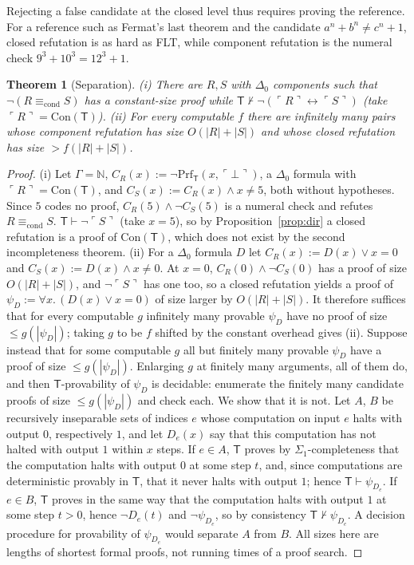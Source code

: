 \documentclass[10pt]{article}
\newtheorem{theorem}{Theorem}
\theoremstyle{definition}
\newcommand{\T}{\mathsf{T}}
\newcommand{\Cl}[1]{\ulcorner #1 \urcorner}
\newcommand{\Econd}{\mathrel{\equiv_{\mathrm{cond}}}}
\begin{document}
Rejecting a false candidate at the closed level thus requires proving the reference. For a
reference such as Fermat's last theorem and the candidate $a^n+b^n\ne c^n+1$, closed
refutation is as hard as FLT, while component refutation is the numeral check
$9^3+10^3=12^3+1$.

\begin{theorem}[Separation]\label{thm:sep}
(i) There are $R,S$ with $\Delta_0$ components such that $\neg(R\Econd S)$ has a constant-size
proof while $\T\nvdash\neg(\Cl R\leftrightarrow\Cl S)$ (take $\Cl R=\mathrm{Con}(\T)$).
(ii) For every computable $f$ there are infinitely many pairs whose component refutation has
size $O(|R|+|S|)$ and whose closed refutation has size $>f(|R|+|S|)$.
\end{theorem}
\begin{proof}
(i) Let $\Gamma=\mathbb N$, $C_R(x):=\neg\mathrm{Prf}_\T(x,\ulcorner\bot\urcorner)$, a $\Delta_0$
formula with $\Cl R=\mathrm{Con}(\T)$, and $C_S(x):=C_R(x)\wedge x\ne 5$, both without hypotheses.
Since $5$ codes no proof, $C_R(5)\wedge\neg C_S(5)$ is a numeral check and refutes $R\Econd S$.
$\T\vdash\neg\Cl S$ (take $x=5$), so by Proposition~\ref{prop:dir} a closed refutation is a proof
of $\mathrm{Con}(\T)$, which does not exist by the second incompleteness theorem. (ii) For a
$\Delta_0$ formula $D$ let $C_R(x):=D(x)\vee x=0$ and $C_S(x):=D(x)\wedge x\ne0$. At $x=0$,
$C_R(0)\wedge\neg C_S(0)$ has a proof of size $O(|R|+|S|)$, and $\neg\Cl S$ has one too, so a
closed refutation yields a proof of $\psi_D:=\forall x.\,(D(x)\vee x=0)$ of size larger by
$O(|R|+|S|)$. It therefore suffices that for every computable $g$ infinitely many provable
$\psi_D$ have no proof of size $\le g(|\psi_D|)$; taking $g$ to be $f$ shifted by the constant
overhead gives (ii). Suppose instead that for some computable $g$ all but finitely many provable
$\psi_D$ have a proof of size $\le g(|\psi_D|)$. Enlarging $g$ at finitely many arguments, all of
them do, and then $\T$-provability of $\psi_D$ is decidable: enumerate the finitely many
candidate proofs of size $\le g(|\psi_D|)$ and check each. We show that it is not. Let $A$, $B$
be recursively inseparable sets of indices $e$ whose computation on input $e$ halts with output
$0$, respectively $1$, and let $D_e(x)$ say that this computation has not halted with output $1$
within $x$ steps. If $e\in A$, $\T$ proves by $\Sigma_1$-completeness that the computation halts
with output $0$ at some step $t$, and, since computations are deterministic provably in $\T$,
that it never halts with output $1$; hence $\T\vdash\psi_{D_e}$. If $e\in B$, $\T$ proves in
the same way that the computation halts with output $1$ at some step $t>0$, hence
$\neg D_e(t)$ and $\neg\psi_{D_e}$, so by consistency $\T\nvdash\psi_{D_e}$. A decision
procedure for provability of $\psi_{D_e}$ would separate $A$ from $B$. All sizes here are
lengths of shortest formal proofs, not running times of a proof search.
\end{proof}
\end{document}
